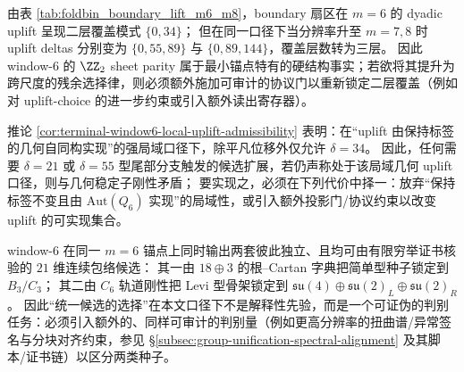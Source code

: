 \begin{remark}\label{rem:window6-sheet-parity-nonpersistent}
由表 \ref{tab:foldbin_boundary_lift_m6_m8}，boundary 扇区在 \(m=6\) 的 dyadic uplift 呈现二层覆盖模式 \(\{0,34\}\)；
但在同一口径下当分辨率升至 \(m=7,8\) 时 uplift deltas 分别变为 \(\{0,55,89\}\) 与 \(\{0,89,144\}\)，覆盖层数转为三层。
因此 window-\(6\) 的 \(\ZZ_2\) sheet parity 属于最小锚点特有的硬结构事实；若欲将其提升为跨尺度的残余选择律，则必须额外施加可审计的协议门以重新锁定二层覆盖（例如对 uplift-choice 的进一步约束或引入额外读出寄存器）。
\end{remark}

\begin{remark}[局域 uplift 口径下的可证伪分界：\texorpdfstring{$\delta\neq 34$}{delta!=34} 必迫使非局域外置]\label{rem:window6-local-uplift-falsifiable-boundary}
推论 \ref{cor:terminal-window6-local-uplift-admissibility} 表明：在“uplift 由保持标签的几何自同构实现”的强局域口径下，除平凡位移外仅允许 \(\delta=34\)。
因此，任何需要 \(\delta=21\) 或 \(\delta=55\) 型尾部分支触发的候选扩展，若仍声称处于该局域几何 uplift 口径，则与几何稳定子刚性矛盾；
要实现之，必须在下列代价中择一：放弃“保持标签不变且由 \(\mathrm{Aut}(Q_6)\) 实现”的局域性，或引入额外投影门/协议约束以改变 uplift 的可实现集合。
\end{remark}

\begin{remark}\label{rem:window6-dim21-double-seed-bifurcation}
window-\(6\) 在同一 \(m=6\) 锚点上同时输出两套彼此独立、且均可由有限穷举证书核验的 \(21\) 维连续包络候选：
其一由 \(18\oplus 3\) 的根--Cartan 字典把简单型种子锁定到 \(B_3/C_3\)；
其二由 \(C_6\) 轨道刚性把 Levi 型骨架锁定到 \(\mathfrak{su}(4)\oplus\mathfrak{su}(2)_L\oplus\mathfrak{su}(2)_R\)。
因此“统一候选的选择”在本文口径下不是解释性先验，而是一个可证伪的判别任务：必须引入额外的、同样可审计的判别量（例如更高分辨率的扭曲谱/异常签名与分块对齐约束，参见 \S\ref{subsec:group-unification-spectral-alignment} 及其脚本/证书链）以区分两类种子。
\end{remark}

